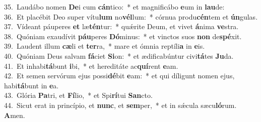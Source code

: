 {35.~}Laudábo nomen \textbf{De}i cum \textbf{cán}tico:~* et magnificábo \textbf{e}um in \textbf{lau}de:\\
{36.~}Et placébit Deo super vítu\textbf{lum} no\textbf{vél}lum:~* córnua produ\textbf{cén}tem et \textbf{ún}gulas.\\
{37.~}Vídeant páuperes \textbf{et} læ\textbf{tén}tur:~* quǽrite Deum, et vivet \textbf{á}nima \textbf{ve}stra.\\
{38.~}Quóniam exaudívit \textbf{páu}peres \textbf{Dó}minus:~* et vinctos suos \textbf{non} de\textbf{spé}xit.\\
{39.~}Laudent illum \textbf{cæ}li et \textbf{ter}ra,~* mare et ómnia reptíli\textbf{a} in \textbf{e}is.\\
{40.~}Quóniam Deus salvam \textbf{fá}ciet \textbf{Si}on:~* et ædificabúntur civi\textbf{tá}tes \textbf{Ju}da.\\
{41.~}Et inhabi\textbf{tá}bunt \textbf{i}bi,~* et hereditáte ac\textbf{quí}rent \textbf{e}am.\\
{42.~}Et semen servórum ejus possi\textbf{dé}bit \textbf{e}am:~* et qui díligunt nomen ejus, habi\textbf{tá}bunt in \textbf{e}a.\\
{43.~}Glória \textbf{Pa}tri, et \textbf{Fí}lio,~* et Spi\textbf{rí}tui \textbf{San}cto.\\
{44.~}Sicut erat in princípio, et \textbf{nunc}, et \textbf{sem}per,~* et in sǽcula sæcu\textbf{ló}rum. \textbf{A}men.\\
